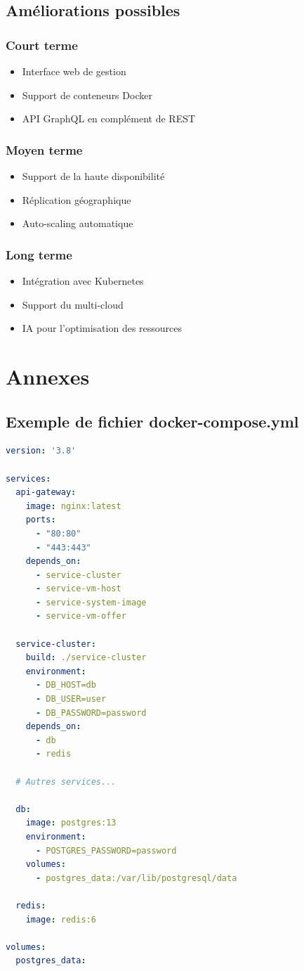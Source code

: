 \documentclass[12pt,a4paper]{report}
\begin{document}
\section{Améliorations possibles}
\subsection{Court terme}
\begin{itemize}
    \item Interface web de gestion
    \item Support de conteneurs Docker
    \item API GraphQL en complément de REST
\end{itemize}

\subsection{Moyen terme}
\begin{itemize}
    \item Support de la haute disponibilité
    \item Réplication géographique
    \item Auto-scaling automatique
\end{itemize}

\subsection{Long terme}
\begin{itemize}
    \item Intégration avec Kubernetes
    \item Support du multi-cloud
    \item IA pour l'optimisation des ressources
\end{itemize}

\chapter*{Annexes}
\section{Exemple de fichier docker-compose.yml}
\begin{lstlisting}[language=yaml]
version: '3.8'

services:
  api-gateway:
    image: nginx:latest
    ports:
      - "80:80"
      - "443:443"
    depends_on:
      - service-cluster
      - service-vm-host
      - service-system-image
      - service-vm-offer

  service-cluster:
    build: ./service-cluster
    environment:
      - DB_HOST=db
      - DB_USER=user
      - DB_PASSWORD=password
    depends_on:
      - db
      - redis

  # Autres services...

  db:
    image: postgres:13
    environment:
      - POSTGRES_PASSWORD=password
    volumes:
      - postgres_data:/var/lib/postgresql/data

  redis:
    image: redis:6

volumes:
  postgres_data:
\end{lstlisting}
\end{document}
